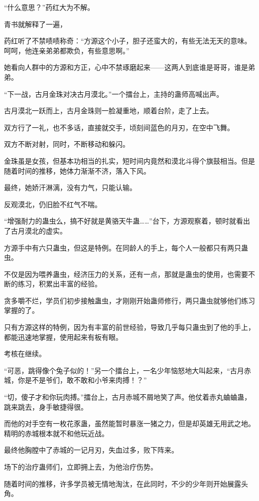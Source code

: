 \begin{this_body}
“什么意思？”药红大为不解。

青书就解释了一遍，

药红听了不禁啧啧称奇：“方源这个小子，胆子还蛮大的，有些无法无天的意味。呵呵，他连亲弟弟都欺负，有些意思啊。”

她看向人群中的方源和方正，心中不禁琢磨起来——这两人到底谁是哥哥，谁是弟弟。

“下一战，古月金珠对决古月漠北。”一个擂台上，主持的蛊师高喊出声。

古月漠北一跃而上，古月金珠则一脸凝重地，顺着台阶，走了上去。

双方行了一礼，也不多话，直接就交手，顷刻间蓝色的月刃，在空中飞舞。

双方不断对射，同时，不断移动和躲闪。

金珠虽是女孩，但基本功相当的扎实，短时间内竟然和漠北斗得个旗鼓相当。但是随着时间的推移，她体力渐渐不济，落入下风。

最终，她娇汗淋漓，没有力气，只能认输。

反观漠北，仍旧脸不红气不喘。

“增强耐力的蛊虫么，搞不好就是黄骆天牛蛊……”台下，方源观察着，顿时就看出了古月漠北的虚实。

方源手中有六只蛊虫，但这是特例。在同龄人的手上，每个人一般都只有两只蛊虫。

不仅是因为喂养蛊虫，经济压力的关系，还有一点，那就是蛊虫的使用，也需要不断的练习，积累出丰富的经验。

贪多嚼不烂，学员们初步接触蛊虫，才刚刚开始蛊师修行，两只蛊虫就够他们练习掌握的了。

只有方源这样的特例，因为有丰富的前世经验，导致几乎每只蛊虫到了他的手上，都能迅速地掌握，使用起来有板有眼。

考核在继续。

“可恶，跳得像个兔子似的！”另一个擂台上，一名少年恼怒地大叫起来，“古月赤城，你是不是爷们，敢不敢和小爷来肉搏！？”

“切，傻子才和你玩肉搏。”擂台上，古月赤城不屑地笑了声。他仗着赤丸蛐蛐蛊，跳来跳去，身手敏捷得很。

而他的对手空有一枚花豕蛊，虽然能暂时暴涨一猪之力，但是却英雄无用武之地。精明的赤城根本就不和他玩近战。

最终他胸膛中了赤城的一记月刃，失血过多，败下阵来。

场下的治疗蛊师们，立即拥上去，为他治疗伤势。

随着时间的推移，许多学员被无情地淘汰，在此同时，不少的少年则开始展露头角。


\end{this_body}
